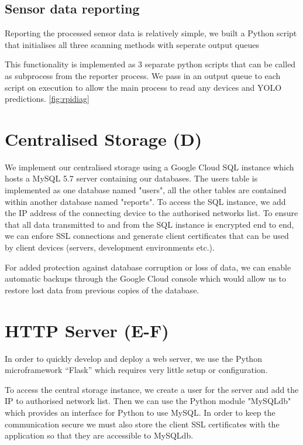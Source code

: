 \documentclass{l4proj}
\begin{document}
\subsection{Sensor data reporting}

Reporting the processed sensor data is relatively simple, we built a Python script that initialises all three scanning methods with seperate output queues



This functionality is implemented as 3 separate python scripts that can be called as subprocess from the reporter process. We pass in an output queue to each script on execution to allow the main process to read any devices and YOLO predictions. \ref{fig:rpidiag}



\section{Centralised Storage (D)}
We implement our centralised storage using a Google Cloud SQL instance which hosts a MySQL 5.7 server containing our databases. The users table is implemented as one database named "users", all the other tables are contained within another database named "reports". To access the SQL instance, we add the IP address of the connecting device to the authorised networks list. To ensure that all data transmitted to and from the SQL instance is encrypted end to end, we can enfore SSL connections and generate client certificates that can be used by client devices (servers, development environments etc.).

For added protection against database corruption or loss of data, we can enable automatic backups through the Google Cloud console which would allow us to restore lost data from previous copies of the database.
 

\section{HTTP Server (E-F)}
In order to quickly develop and deploy a web server, we use the Python microframework “Flask” which requires very little setup or configuration. 

To access the central storage instance, we create a user for the server and add the IP to authorised network list. Then we can use the Python module "MySQLdb" which provides an interface for Python to use MySQL. In order to keep the communication secure we must also store the client SSL certificates with the application so that they are accessible to MySQLdb.
\end{document}
